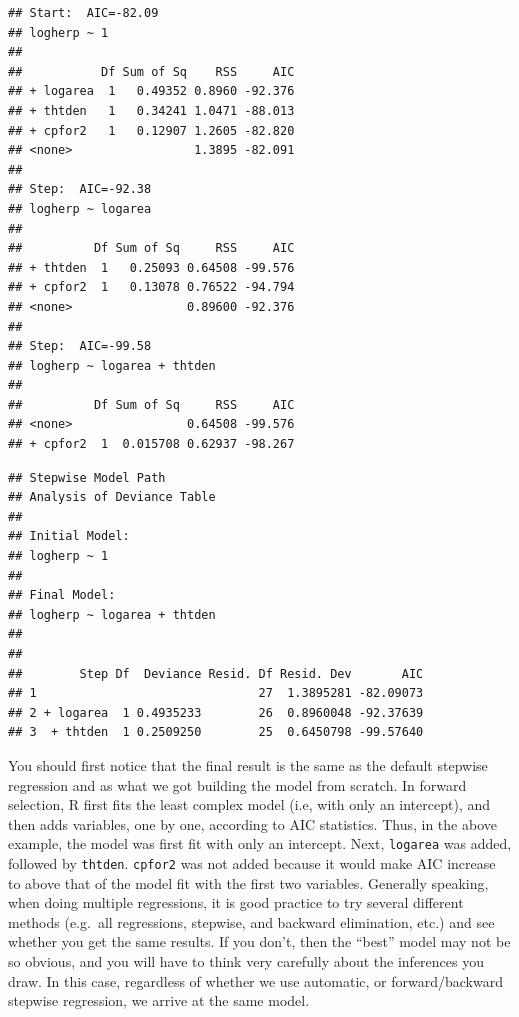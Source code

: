 \documentclass[
  12pt,
]{book}
\newenvironment{Shaded}{\begin{snugshade}}{\end{snugshade}}
\newcommand{\CommentTok}[1]{\textcolor[rgb]{0.56,0.35,0.01}{\textit{#1}}}
\newcommand{\NormalTok}[1]{#1}
\newcommand{\OperatorTok}[1]{\textcolor[rgb]{0.81,0.36,0.00}{\textbf{#1}}}
\begin{document}
\begin{verbatim}
## Start:  AIC=-82.09
## logherp ~ 1
## 
##           Df Sum of Sq    RSS     AIC
## + logarea  1   0.49352 0.8960 -92.376
## + thtden   1   0.34241 1.0471 -88.013
## + cpfor2   1   0.12907 1.2605 -82.820
## <none>                 1.3895 -82.091
## 
## Step:  AIC=-92.38
## logherp ~ logarea
## 
##          Df Sum of Sq     RSS     AIC
## + thtden  1   0.25093 0.64508 -99.576
## + cpfor2  1   0.13078 0.76522 -94.794
## <none>                0.89600 -92.376
## 
## Step:  AIC=-99.58
## logherp ~ logarea + thtden
## 
##          Df Sum of Sq     RSS     AIC
## <none>                0.64508 -99.576
## + cpfor2  1  0.015708 0.62937 -98.267
\end{verbatim}

\begin{Shaded}
\end{Shaded}

\begin{verbatim}
## Stepwise Model Path 
## Analysis of Deviance Table
## 
## Initial Model:
## logherp ~ 1
## 
## Final Model:
## logherp ~ logarea + thtden
## 
## 
##        Step Df  Deviance Resid. Df Resid. Dev       AIC
## 1                               27  1.3895281 -82.09073
## 2 + logarea  1 0.4935233        26  0.8960048 -92.37639
## 3  + thtden  1 0.2509250        25  0.6450798 -99.57640
\end{verbatim}

You should first notice that the final result is the same as the default stepwise regression and as what we got building the model from scratch. In forward selection, R first fits the least complex model (i.e, with only an intercept), and then adds variables, one by one, according to AIC statistics. Thus, in the above example, the model was first fit with only an intercept. Next, \texttt{logarea} was added, followed by \texttt{thtden}. \texttt{cpfor2} was not added because it would make AIC increase to above that of the model fit with the first two variables. Generally speaking, when doing multiple regressions, it is good practice to try several different methods (e.g.~all regressions, stepwise, and backward elimination, etc.) and see whether you get the same results. If you don't, then the ``best'' model may not be so obvious, and you will have to think very carefully about the inferences you draw. In this case, regardless of whether we use automatic, or forward/backward stepwise regression, we arrive at the same model.
\end{document}
